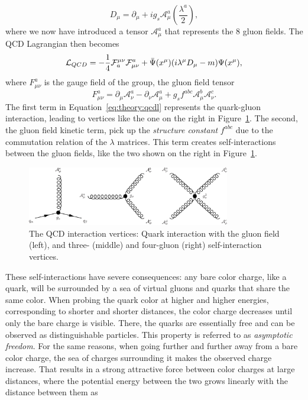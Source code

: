 \begin{equation}
  D_\mu=\partial_\mu + ig_s \mathcal{A}_{\mu}^a (\frac{\lambda^a}{2}),
\end{equation}
where we now have introduced a tensor $\mathcal{A}_{\mu}^a$ that represents the 8 gluon fields.
The QCD Lagrangian then becomes
\begin{equation}
  \label{eq:theory:qcdl}
   \mathcal{L}_{QCD} =-\frac{1}{4}{\cal F}_{a}^{\mu\nu}{\cal F}^{a}_{\mu\nu}+\bar{\Psi}(x^{\mu})(i\lambda^{\mu}D_{\mu}-m)\Psi(x^{\mu}),
\end{equation}
where $F_{\mu\nu}^a$ is the gauge field of the group, the gluon field tensor 
\begin{equation}
F_{\mu\nu}^a=\partial_{\mu} \mathcal{A}_{\nu}^a-\partial_{\nu} \mathcal{A}_{\mu}^a+g_s f^{abc}\mathcal{A}_{\mu}^b\mathcal{A}_{\nu}^c.
\end{equation}
The first term in Equation~\ref{eq:theory:qcdl} represents the quark-gluon interaction, leading to vertices like the one on the right in Figure~\ref{fig:theory:qcdint}. The second, the gluon field kinetic term, pick up the \emph{structure constant} $f^{abc}$ due to the commutation relation of the $\lambda$ matrices. This term creates self-interactions between the gluon fields, like the two shown on the right in Figure~\ref{fig:theory:qcdint}.
\begin{figure}[h!]
\centering
\includegraphics[width=0.79\textwidth]{figures/theory/QCD_vtx.pdf}
\caption{The QCD interaction vertices: Quark interaction with the gluon field (left), and three- (middle) and four-gluon (right) self-interaction vertices.}
\label{fig:theory:qcdint}
\end{figure}
These self-interactions have severe consequences: any bare color charge, like a quark, will be surrounded by a sea of virtual gluons and quarks that share the same color. When probing the quark color at higher and higher energies, corresponding to shorter and shorter distances, the color charge decreases until only the bare charge is visible. There, the quarks are essentially free and can be observed as distinguishable particles. This property is referred to as \emph{asymptotic freedom}. For the same reasons, when going further and further away from a bare color charge, the sea of charges surrounding it makes the observed charge increase. That results in a strong attractive force between color charges at large distances, where the potential energy between the two grows linearly with the distance between them as
